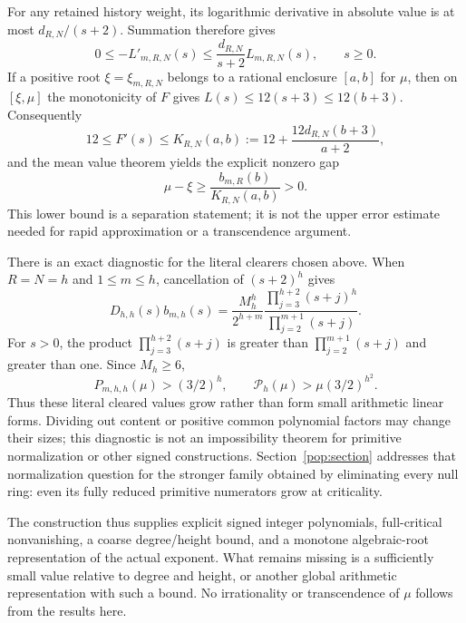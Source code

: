 For any retained history weight, its logarithmic derivative in absolute
value is at most $d_{R,N}/(s+2)$. Summation therefore gives
\[
 0\le-L'_{m,R,N}(s)
 \le\frac{d_{R,N}}{s+2}L_{m,R,N}(s),\qquad s\ge0.
\]
If a positive root $\xi=\xi_{m,R,N}$ belongs to a rational enclosure
$[a,b]$ for $\mu$, then on $[\xi,\mu]$ the monotonicity of $F$ gives
$L(s)\le12(s+3)\le12(b+3)$. Consequently
\[
 12\le F'(s)\le
 K_{R,N}(a,b):=12+\frac{12d_{R,N}(b+3)}{a+2},
\]
and the mean value theorem yields the explicit nonzero gap
\[
 \boxed{\displaystyle
 \mu-\xi\ge\frac{b_{m,R}(b)}{K_{R,N}(a,b)}>0.}
\]
This lower bound is a separation statement; it is not the upper error
estimate needed for rapid approximation or a transcendence argument.

There is an exact diagnostic for the literal clearers chosen above.
When $R=N=h$ and $1\le m\le h$, cancellation of $(s+2)^h$ gives
\[
 D_{h,h}(s)b_{m,h}(s)
 =\frac{M_h^h}{2^{h+m}}
 \frac{\displaystyle\prod_{j=3}^{h+2}(s+j)^h}
      {\displaystyle\prod_{j=2}^{m+1}(s+j)}.
\]
For $s>0$, the product $\prod_{j=3}^{h+2}(s+j)$ is greater than
$\prod_{j=2}^{m+1}(s+j)$ and greater than one. Since $M_h\ge6$,
\[
 \boxed{P_{m,h,h}(\mu)>(3/2)^h,\qquad
 \mathcal P_h(\mu)>\mu(3/2)^{h^2}.}
\]
Thus these literal cleared values grow rather than form small arithmetic
linear forms. Dividing out content or positive common polynomial factors
may change their sizes; this diagnostic is not an impossibility theorem
for primitive normalization or other signed constructions.
Section~\ref{pop:section} addresses that normalization question for
the stronger family obtained by eliminating every null ring: even
its fully reduced primitive numerators grow at criticality.

The construction thus supplies explicit signed integer polynomials,
full-critical nonvanishing, a coarse degree/height bound, and a monotone
algebraic-root representation of the actual exponent. What remains
missing is a sufficiently small value relative to degree and height,
or another global arithmetic representation with such a bound. No
irrationality or transcendence of $\mu$ follows from the results here.
